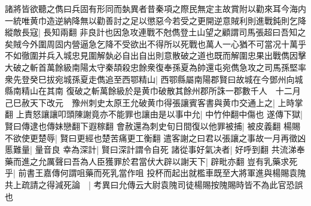 諸將皆欲聽之儁曰兵固有形同而埶異者昔秦項之際民無定主故賞附以勸來耳今海内一統唯黄巾造逆納降無以勸善討之足以懲惡今若受之更開逆意賊利則進戰鈍則乞降縱敵長寇|{
	長知兩翻}
非良計也因急攻連戰不尅儁登土山望之顧謂司馬張超曰吾知之矣賊今外圍周固内營逼急乞降不受欲出不得所以死戰也萬人一心猶不可當况十萬乎不如徹圍并兵入城忠見圍解埶必自出自出則意散破之道也既而解圍忠果出戰儁因擊大破之斬首萬餘級南陽太守秦頡殺忠餘衆復奉孫夏為帥還屯宛儁急攻之司馬孫堅率衆先登癸巳拔宛城孫夏走儁追至西鄂精山|{
	西鄂縣屬南陽郡賢曰故城在今鄧州向城縣南精山在其南}
復破之斬萬餘級於是黄巾破散其餘州郡所誅一郡數千人　十二月己巳赦天下改元　豫州刺史太原王允破黄巾得張讓賓客書與黄巾交通上之|{
	上時掌翻}
上責怒讓讓叩頭陳謝竟亦不能罪也讓由是以事中允|{
	中竹仲翻中傷也}
遂傳下獄|{
	賢曰傳逮也傳妹戀翻下遐稼翻}
會赦還為刺史旬日間復以他罪被捕|{
	被皮義翻}
楊賜不欲使更楚辱|{
	賢曰更經也楚苦痛更工衡翻}
遣客謝之曰君以張讓之事故一月再徵凶慝難量|{
	量音良}
幸為深計|{
	賢曰深計謂令自死}
諸從事好氣决者|{
	好呼到翻}
共流涕奉藥而進之允厲聲曰吾為人臣獲罪於君當伏大辟以謝天下|{
	辟毗亦翻}
豈有乳藥求死乎|{
	前書王嘉傳何謂咀藥而死乳當作咀}
投杯而起出就檻車既至大將軍進與楊賜袁隗共上疏請之得減死論　|{
	考異曰允傳云大尉袁隗司徒楊賜按隗賜時皆不為此官恐誤也}


